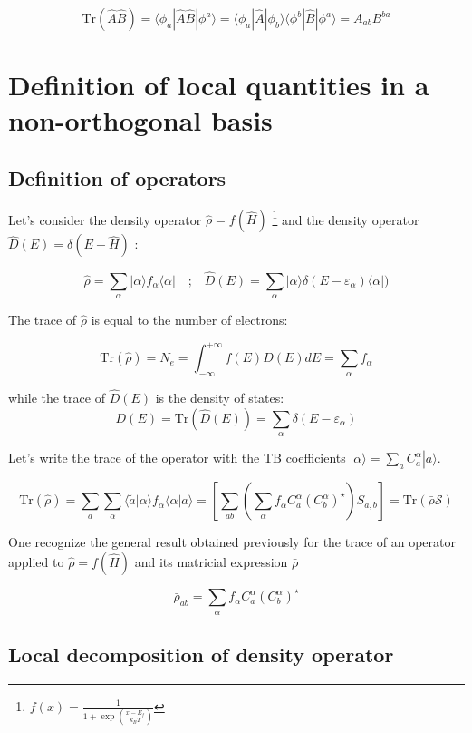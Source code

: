 \documentclass{article}
\newcommand{\bra}[1]{\langle #1|}
\newcommand{\ket}[1]{|#1\rangle}
\newcommand{\braket}[2]{\langle #1|#2\rangle}
\newcommand{\op}[1]{\hat{#1}}
\begin{document}
\[ \text{Tr}(\op{A}\op{B})= \bra{\phi_a}\op{A}\op{B}\ket{\phi^a}=
\bra{\phi_a}\op{A} \ket{\phi_b}\bra{\phi^b}\op{B}\ket{\phi^a}= A_{ab}B^{ba}\]

\section{Definition of local quantities in a non-orthogonal basis}


\subsection{Definition of operators}

\noindent 
Let's consider the density operator $\op{\rho}=f(\op{H})$ \footnote{$f(x)=\frac{1}{1+\exp(\frac{x-E_f}{k_BT})}$} and the density operator $\op{D}(E)=\delta(E-\op{H})$ :

\[\op{\rho}=\sum_{\alpha} |\alpha \rangle f_{\alpha}\langle \alpha | \quad \mbox{;} \quad
\op{D}(E)=\sum_{\alpha} |\alpha \rangle \delta(E-\varepsilon_{\alpha})\langle \alpha | )
\]

\noindent
The trace of $\op{\rho}$ is equal to the number of electrons:

\[ \mbox{Tr}(\op{\rho})=N_e= \int_{-\infty}^{+\infty} f(E) D(E)dE = \sum_{\alpha }f_{\alpha} \]

\noindent
while the trace of $\op{D}(E)$  is the density of states:
\[
D(E)=\text{Tr}(\op{D}(E))=\sum_{\alpha}  \delta(E-\varepsilon_{\alpha})
\]

\noindent Let's write the trace of the operator with the TB coefficients $ \ket{\alpha}=\sum_a C_a^{\alpha}\ket{a}$.
 
\[ \displaystyle \mbox{Tr}(\op{\rho})=
 \sum_{a}\sum_{\alpha} \braket{\tilde{a}}{\alpha} f_{\alpha}  \braket{\alpha}{a}
= \left[\sum_{a  b} 
\left( \sum_{\alpha}  f_{\alpha}  
C_{a}^{\alpha} (C_{b }^{\alpha})^{\star}\right)
 S_{a,b} \right]=\text{Tr} \left( \bar{\rho} \mathcal{S}\right)
 \]

\noindent
One recognize the general result obtained previously for the trace of an operator applied to $\op{\rho}=f(\op{H})$ and its matricial expression $\bar{\rho}$

\[ \bar{\rho}_{a b}=  \sum_{\alpha} f_{\alpha} C_{a}^{\alpha}(C_{b}^{\alpha})^{\star}    \]

\subsection{Local decomposition of density operator}
\end{document}
